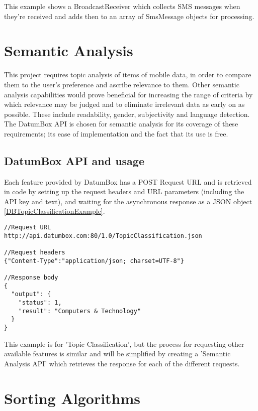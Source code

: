 This example shows a BroadcastReceiver which collects SMS messages when they're received and adds then to an array of SmsMessage objects for processing. 

\section{Semantic Analysis}

This project requires topic analysis of items of mobile data, in order to compare them to the user's preference and ascribe relevance to them. Other semantic analysis capabilities would prove beneficial for increasing the range of criteria by which relevance may be judged and to eliminate irrelevant data as early on as possible. These include readability, gender, subjectivity and language detection. The DatumBox API is chosen for semantic analysis for its coverage of these requirements; its ease of implementation and the fact that its use is free. 

\subsection{DatumBox API and usage}

Each feature provided by DatumBox has a POST Request URL and is retrieved in code by setting up the request headers and URL parameters (including the API key and text), and waiting for the asynchronous response as a JSON object \ref{DBTopicClassificationExample}.

\lstset{language=Java, caption=DatumBox Topic Classification example, label=DBTopicClassificationExample}
\begin{lstlisting}
//Request URL
http://api.datumbox.com:80/1.0/TopicClassification.json

//Request headers
{"Content-Type":"application/json; charset=UTF-8"}

//Response body
{
  "output": {
    "status": 1,
    "result": "Computers & Technology"
  }
}
\end{lstlisting}
This example is for 'Topic Classification', but the process for requesting other available features is similar and will be simplified by creating a 'Semantic Analysis API' which retrieves the response for each of the different requests. 

\section{Sorting Algorithms}

